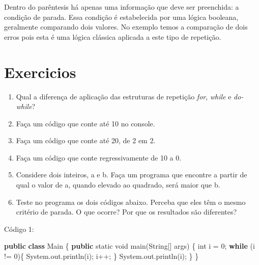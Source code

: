 \documentclass[
]{book}
\newenvironment{Shaded}{\begin{snugshade}}{\end{snugshade}}
\newcommand{\BuiltInTok}[1]{#1}
\newcommand{\DataTypeTok}[1]{\textcolor[rgb]{0.13,0.29,0.53}{#1}}
\newcommand{\DecValTok}[1]{\textcolor[rgb]{0.00,0.00,0.81}{#1}}
\newcommand{\FunctionTok}[1]{\textcolor[rgb]{0.00,0.00,0.00}{#1}}
\newcommand{\KeywordTok}[1]{\textcolor[rgb]{0.13,0.29,0.53}{\textbf{#1}}}
\newcommand{\NormalTok}[1]{#1}
\providecommand{\tightlist}{%
  \setlength{\itemsep}{0pt}\setlength{\parskip}{0pt}}
\begin{document}
Dentro do parêntesis há apenas uma informação que deve ser preenchida: a condição de parada. Essa condição é estabelecida por uma lógica booleana, geralmente comparando dois valores. No exemplo temos a comparação de dois erros pois esta é uma lógica clássica aplicada a este tipo de repetição.

\hypertarget{exercicios}{%
\section*{Exercicios}\label{exercicios}}

\begin{enumerate}
\def\labelenumi{\arabic{enumi}.}
\tightlist
\item
  Qual a diferença de aplicação das estruturas de repetição \emph{for}, \emph{while} e \emph{do-while}?
\item
  Faça um código que conte até 10 no console.
\item
  Faça um código que conte até 20, de 2 em 2.
\item
  Faça um código que conte regressivamente de 10 a 0.
\item
  Considere dois inteiros, a e b. Faça um programa que encontre a partir de qual o valor de a, quando elevado ao quadrado, será maior que b.
\item
  Teste no programa os dois códigos abaixo. Perceba que eles têm o mesmo critério de parada. O que ocorre? Por que os resultados são diferentes?
\end{enumerate}

Código 1:

\begin{Shaded}
\begin{Highlighting}[]
\KeywordTok{public} \KeywordTok{class}\NormalTok{ Main \{}
    \KeywordTok{public} \DataTypeTok{static} \DataTypeTok{void} \FunctionTok{main}\NormalTok{(}\BuiltInTok{String}\NormalTok{[] args) \{}
        \DataTypeTok{int}\NormalTok{ i = }\DecValTok{0}\NormalTok{;}
        \KeywordTok{while}\NormalTok{ (i != }\DecValTok{0}\NormalTok{)\{}
            \BuiltInTok{System}\NormalTok{.}\FunctionTok{out}\NormalTok{.}\FunctionTok{println}\NormalTok{(i);}
\NormalTok{            i++;}
\NormalTok{        \}}
        \BuiltInTok{System}\NormalTok{.}\FunctionTok{out}\NormalTok{.}\FunctionTok{println}\NormalTok{(i);}
\NormalTok{    \}}
\NormalTok{\}}
\end{Highlighting}
\end{Shaded}
\end{document}

